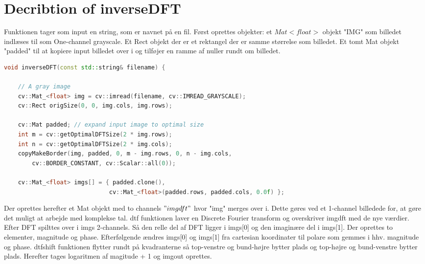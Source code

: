 \documentclass{article}
\begin{document}
\section{Decribtion of inverseDFT}
Funktionen tager som input en string, som er navnet på en fil. Først oprettes objekter: et $Mat <float>$ objekt "IMG" som billedet indlæses til som One-channel grayscale. Et Rect objekt der er et rektangel der er samme størrelse som billedet. Et tomt Mat objekt "padded" til at kopiere input billedet over i og tilføjer en ramme af nuller rundt om billedet. \newline 
\begin{lstlisting}[language=c++]
void inverseDFT(const std::string& filename) {

    // A gray image
    cv::Mat_<float> img = cv::imread(filename, cv::IMREAD_GRAYSCALE);
    cv::Rect origSize(0, 0, img.cols, img.rows);

    cv::Mat padded; // expand input image to optimal size
    int m = cv::getOptimalDFTSize(2 * img.rows);
    int n = cv::getOptimalDFTSize(2 * img.cols); 
    copyMakeBorder(img, padded, 0, m - img.rows, 0, n - img.cols,
        cv::BORDER_CONSTANT, cv::Scalar::all(0));

    cv::Mat_<float> imgs[] = { padded.clone(),
                              cv::Mat_<float>(padded.rows, padded.cols, 0.0f) };
\end{lstlisting}
Der oprettes herefter et Mat objekt med to channels $"img dft"$ hvor "img" merges over i. Dette gøres ved et 1-channel billedede for, at gøre det muligt at arbejde med komplekse tal. \newline 
dtf funktionen laver en Discrete Fourier transform og overskriver imgdft med de nye værdier. \newline 
Efter DFT spilttes over i imgs 2-channels. Så den relle del af DFT ligger i imgs[0] og den imaginære del i imgs[1]. \newline 
Der oprettes to elementer, magnitude og phase. Efterfølgende ændres imgs[0] og imgs[1] fra cartesian koordinater til polare som gemmes i hhv. magnitude og phase. \newline 
dtfshift funktionen flytter rundt på kvadranterne så top-venstre og bund-højre bytter plads og top-højre og bund-venstre bytter plads. \newline 
Herefter tages logaritmen af magitude + 1 og imgout oprettes. \newline 
\end{document}

